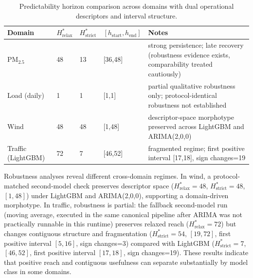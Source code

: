 \documentclass[11pt]{article}
\begin{document}
\begin{table}[h]
\centering
\begin{tabular}{lllll}
\toprule
Domain & $H^*_{\mathrm{relax}}$ & $H^*_{\mathrm{strict}}$ & $[h_{\mathrm{start}},h_{\mathrm{end}}]$ & Notes \\
\midrule
PM$_{2.5}$ & 48 & 13 & [36,48] & strong persistence; late recovery (robustness evidence exists, comparability treated cautiously) \\
Load (daily) & 1 & 1 & [1,1] & partial qualitative robustness only; protocol-identical robustness not established \\
Wind & 48 & 48 & [1,48] & descriptor-space morphotype preserved across LightGBM and ARIMA(2,0,0) \\
Traffic (LightGBM) & 72 & 7 & [46,52] & fragmented regime; first positive interval [17,18], sign changes=19 \\
\bottomrule
\end{tabular}
\caption{Predictability horizon comparison across domains with dual operational descriptors and interval structure.}
\label{tab:results}
\end{table}

Robustness analyses reveal different cross-domain regimes. In wind, a protocol-matched second-model check preserves descriptor space ($H^*_{\mathrm{relax}}=48$, $H^*_{\mathrm{strict}}=48$, $[1,48]$) under LightGBM and ARIMA(2,0,0), supporting a domain-driven morphotype. In traffic, robustness is partial: the fallback second-model run (moving average, executed in the same canonical pipeline after ARIMA was not practically runnable in this runtime) preserves relaxed reach ($H^*_{\mathrm{relax}}=72$) but changes contiguous structure and fragmentation ($H^*_{\mathrm{strict}}=54$, $[19,72]$, first positive interval $[5,16]$, sign changes=3) compared with LightGBM ($H^*_{\mathrm{strict}}=7$, $[46,52]$, first positive interval $[17,18]$, sign changes=19). These results indicate that positive reach and contiguous usefulness can separate substantially by model class in some domains.
\end{document}
